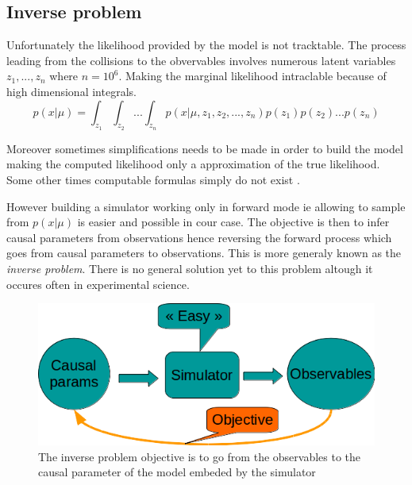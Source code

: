 \subsection{Inverse problem} %
\label{sub:inverse_problem}


Unfortunately the likelihood provided by the model is not tracktable.
The process leading from the collisions to the obvervables involves numerous latent variables $z_1, ..., z_n$ where $n=10^6$.
Making the marginal likelihood intraclable because of high dimensional integrals.
\begin{equation}
	\label{eq:intractable_integral}
	p(x|\mu) = \int_{z_1} \int_{z_2} ... \int_{z_n} p(x|\mu, z_1, z_2, ..., z_n) p(z_1) p(z_2) ... p(z_n)
\end{equation}


Moreover sometimes simplifications needs to be made in order to build the model \needcite making the computed likelihood only a approximation of the true likelihood.
Some other times computable formulas simply do not exist \needcite.



However building a simulator working only in forward mode ie allowing to sample from $p(x|\mu)$ is easier and possible in cour case.
The objective is then to infer causal parameters from observations hence reversing the forward process which goes from causal parameters to observations.
This is more generaly known as the \emph{inverse problem}.
There is no general solution yet to this problem altough it occures often in experimental science.


\begin{figure}[htb]
    \centering
    \includegraphics[width=0.8\linewidth]{inverse_problem}
    \caption{The inverse problem objective is to go from the observables to the causal parameter of the model embeded by the simulator}
    \label{fig:inverse_problem}
\end{figure}








